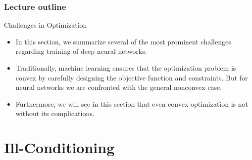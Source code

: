








\begin{frame}
\frametitle{Lecture outline}
\tableofcontents
\end{frame}

\begin{frame}{Challenges in Optimization}
 \begin{itemize}
   \item In this section, we summarize several of the most prominent challenges regarding training of deep neural networks.
   \item Traditionally, machine learning ensures that the optimization problem is convex by carefully designing
the objective function and constraints. But for neural networks we are confronted with the general nonconvex case. 
   \item Furthermore, we will see in this section that even convex optimization is not without its complications.
 \end{itemize}
\end{frame}

\section{Ill-Conditioning}


